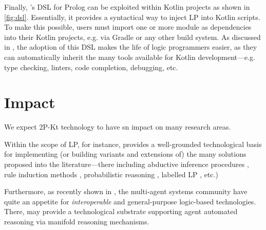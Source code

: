 \documentclass[12pt,a4paper,openright,twoside]{book}
\begin{document}

Finally, \twopkt{}'s DSL for Prolog can be exploited within Kotlin projects as shown in \cref{fig:dsl}.
%
Essentially, it provides a syntactical way to inject LP into Kotlin scripts.
%
To make this possible, users must import one or more  module as dependencies into their Kotlin projects, e.g. via Gradle or any other build system.
%
As discussed in \cite{kotlindsi4prolog-woa2020}, the adoption of this DSL makes the life of logic programmers easier, as they can automatically inherit the many tools available for Kotlin development---e.g. type checking, linters, code completion, debugging, etc.


\section{Impact}
\label{sec:impact}



We expect 2P-Kt technology to have sn impact on many research areas.

Within the scope of LP, for instance, \twopkt{} provides a well-grounded technological basis for implementing (or building variants and extensions of) the many solutions proposed into the literature---there including abductive inference procedures \cite{FungIff97}, rule induction methods \cite{Muggleton94}, probabilistic reasoning \cite{RaedtK15}, labelled LP \cite{labelledlp-fi161}, etc.)

Furthermore, as recently shown in \cite{lptech4mas-jaamas35}, the multi-agent systems community have quite an appetite for  \emph{interoperable} and general-purpose logic-based technologies.
%
There, \twopkt{} may provide a technological substrate supporting agent automated reasoning via manifold reasoning mechanisms.
\end{document}
